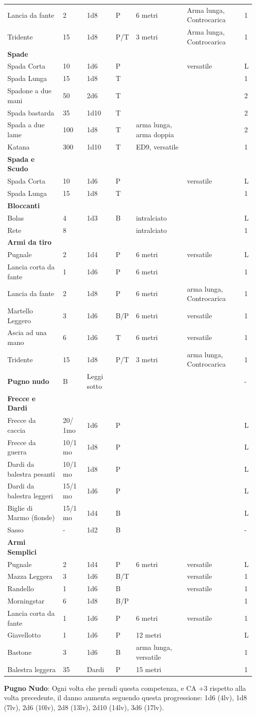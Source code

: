 \documentclass[a4paper,11pt,twoside,openany]{book}
\begin{document}
{\begin{longtable}{|L{3.5cm} |k{1,3cm} |k{1.5cm}| k{1.3cm} |L{3.2cm} |k{2.7cm}|k{2cm}|}
	Lancia da fante & 2 & 1d8 & P & 6 metri &Arma lunga, Controcarica&1 \tabularnewline
	Tridente & 15 & 1d8 & P/T & 3 metri & Arma lunga, Controcarica &1\tabularnewline
	\textbf{Spade} & & & & & &\tabularnewline
	Spada Corta & 10 & 1d6 & P & & versatile&L\tabularnewline
	Spada Lunga & 15 & 1d8 & T & &&1 \tabularnewline
	Spadone a due mani & 50 & 2d6 & T & & &2\tabularnewline
	Spada bastarda & 35 & 1d10 & T & & &2\tabularnewline
	Spada a due lame & 100 & 1d8 & T & arma lunga, arma doppia & &2\tabularnewline
	Katana & 300 & 1d10 & T & ED9, versatile & &1\tabularnewline
	\textbf{Spada e Scudo} & & & & & &\tabularnewline
	Spada Corta & 10 & 1d6 & P & & versatile&L\tabularnewline
	Spada Lunga & 15 & 1d8 & T & & &1\tabularnewline
	\textbf{Bloccanti} & & & & & &\tabularnewline
	Bolas & 4 & 1d3 & B & intralciato & &L\tabularnewline
	Rete & 8 & & & intralciato & &1\tabularnewline
	\textbf{Armi da tiro} & & & & && \tabularnewline
	Pugnale & 2 & 1d4 & P & 6 metri & versatile&L\tabularnewline
	Lancia corta da fante & 1 & 1d6 & P & 6 metri & &1\tabularnewline
	Lancia da fante & 2 & 1d8 & P & 6 metri &arma lunga, Controcarica&1\tabularnewline
	Martello Leggero & 3 & 1d6 & B/P & 6 metri & versatile&1\tabularnewline
	Ascia ad una mano & 6 & 1d6 & T & 6 metri & versatile&1\tabularnewline
	Tridente & 15 & 1d8 & P/T & 3 metri&arma lunga, Controcarica &1\tabularnewline
	\textbf{Pugno nudo} & B & Leggi sotto & & & &-\tabularnewline
	\textbf{Frecce e Dardi} & & & & & &\tabularnewline
	Frecce da caccia & 20/ 1mo & 1d6 & P & & &L\tabularnewline
	Frecce da guerra & 10/1 mo & 1d8 & P & & &L\tabularnewline
	Dardi da balestra pesanti & 10/1 mo & 1d8 & P & & &L\tabularnewline
	Dardi da balestra leggeri & 15/1 mo & 1d6 & P & & &L\tabularnewline
	Biglie di Marmo (fionde) & 15/1 mo & 1d4 & B & & &L\tabularnewline
	Sasso & - & 1d2 & B & & &-\tabularnewline
	\textbf{Armi Semplici} & & & & & &\tabularnewline
	Pugnale & 2 & 1d4 & P & 6 metri & versatile&L\tabularnewline
	Mazza Leggera & 3 & 1d6 & B/T & & versatile&1\tabularnewline
	Randello & 1 & 1d6 & B & & versatile&1\tabularnewline
	Morningstar & 6 & 1d8 & B/P & & &1\tabularnewline
	Lancia corta da fante & 1 & 1d6 & P & 6 metri & versatile&1\tabularnewline
	Giavellotto & 1 & 1d6 & P & 12 metri & &L\tabularnewline
	Bastone & 3 & 1d6 & B & arma lunga, versatile & &1\tabularnewline
	Balestra leggera & 35 & Dardi & P & 15 metri & &1\tabularnewline
\end{longtable}



\textbf{Pugno Nudo}: Ogni volta che prendi questa competenza, e CA +3 rispetto alla volta precedente, il danno aumenta seguendo questa progressione: 1d6 (4lv), 1d8 (7lv), 2d6 (10lv), 2d8 (13lv), 2d10 (14lv), 3d6 (17lv). 

}
\end{document}
